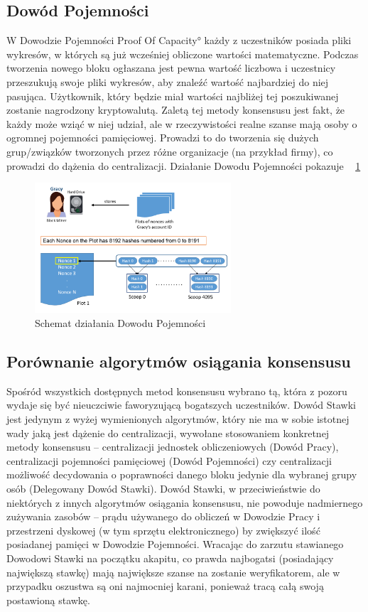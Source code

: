 \subsection{Dowód Pojemności}
\label{ssec:PoC}
W Dowodzie Pojemności \ang{Proof Of Capacity} każdy z uczestników posiada pliki wykresów, w których są już wcześniej obliczone wartości matematyczne. Podczas tworzenia nowego bloku ogłaszana jest pewna wartość liczbowa i uczestnicy przeszukują swoje pliki wykresów, aby znaleźć wartość najbardziej do niej pasująca. Użytkownik, który będzie miał wartości najbliżej tej poszukiwanej zostanie nagrodzony kryptowalutą. Zaletą tej metody konsensusu jest fakt, że każdy może wziąć w niej udział, ale w rzeczywistości realne szanse mają osoby o ogromnej pojemności pamięciowej. Prowadzi to do tworzenia się dużych grup/związków tworzonych przez różne organizacje (na przykład firmy), co prowadzi do dążenia do centralizacji. Działanie Dowodu Pojemności pokazuje \figurename{~ \ref{fig:ConsensusPOC}}
\clearpage
\begin{figure}[ht]
    \centering
    \includegraphics[width=0.65\textwidth]{Images/ConsensusPOC.png}
    \caption{Schemat działania Dowodu Pojemności}
    \label{fig:ConsensusPOC}
\end{figure}

\subsection{Porównanie algorytmów osiągania konsensusu}
\label{ssec:KonsensusPorownanie}
Spośród wszystkich dostępnych metod konsensusu wybrano tą, która z pozoru wydaje się być nieuczciwie faworyzującą bogatszych uczestników. Dowód Stawki jest jedynym z wyżej wymienionych algorytmów, który nie ma w sobie istotnej wady jaką jest dążenie do centralizacji, wywołane stosowaniem konkretnej metody konsensusu – centralizacji jednostek obliczeniowych (Dowód Pracy), centralizacji pojemności pamięciowej (Dowód Pojemności) czy centralizacji możliwość decydowania o poprawności danego bloku jedynie dla wybranej grupy osób (Delegowany Dowód Stawki). Dowód Stawki, w przeciwieństwie do niektórych z innych algorytmów osiągania konsensusu, nie powoduje nadmiernego zużywania zasobów – prądu używanego do obliczeń w Dowodzie Pracy i przestrzeni dyskowej (w tym sprzętu elektronicznego) by zwiększyć ilość posiadanej pamięci w Dowodzie Pojemności. Wracając do zarzutu stawianego Dowodowi Stawki na początku akapitu, co prawda najbogatsi (posiadający największą stawkę) mają największe szanse na zostanie weryfikatorem, ale w przypadku oszustwa są oni najmocniej karani, ponieważ tracą całą swoją postawioną stawkę.

